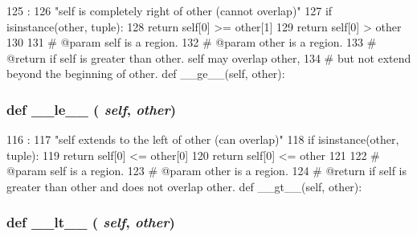 \begin{DoxyCode}
125                            :
126         "self is completely right of other (cannot overlap)"
127         if isinstance(other, tuple):
128             return self[0] >= other[1]
129         return self[0] > other
130 
131     # @param self is a region.
132     # @param other is a region.
133     # @return if self is greater than other.  self may overlap other,
134     # but not extend beyond the beginning of other.
    def __ge__(self, other):
\end{DoxyCode}
\hypertarget{classm5_1_1util_1_1region_1_1Region_a83166e4aabc2805e71aef3a43f016181}{
\subsubsection[{\_\-\_\-le\_\-\_\-}]{\setlength{\rightskip}{0pt plus 5cm}def \_\-\_\-le\_\-\_\- ( {\em self}, \/   {\em other})}}
\label{classm5_1_1util_1_1region_1_1Region_a83166e4aabc2805e71aef3a43f016181}



\begin{DoxyCode}
116                            :
117         "self extends to the left of other (can overlap)"
118         if isinstance(other, tuple):
119             return self[0] <= other[0]
120         return self[0] <= other
121 
122     # @param self is a region.
123     # @param other is a region.
124     # @return if self is greater than other and does not overlap other.
    def __gt__(self, other):
\end{DoxyCode}
\hypertarget{classm5_1_1util_1_1region_1_1Region_a6a45920abc8ecf2d458d174ea7304f8a}{
\subsubsection[{\_\-\_\-lt\_\-\_\-}]{\setlength{\rightskip}{0pt plus 5cm}def \_\-\_\-lt\_\-\_\- ( {\em self}, \/   {\em other})}}
\label{classm5_1_1util_1_1region_1_1Region_a6a45920abc8ecf2d458d174ea7304f8a}



